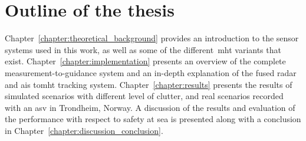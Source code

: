 \section{Outline of the thesis}\label{sec:outline_thesis}
Chapter~\ref{chapter:theoretical_background} provides an introduction to the sensor systems used in this work, as well as some of the different~\gls{mht} variants that exist. Chapter~\ref{chapter:implementation} presents an overview of the complete measurement-to-guidance system and an in-depth explanation of the fused \gls{radar} and \gls{ais} \gls{tomht} tracking system. Chapter~\ref{chapter:results} presents the results of simulated scenarios with different level of clutter, and real scenarios recorded with an \gls{asv} in Trondheim, Norway. A discussion of the results and evaluation of the performance with respect to safety at sea is presented along with a conclusion in Chapter~\ref{chapter:discussion_conclusion}.